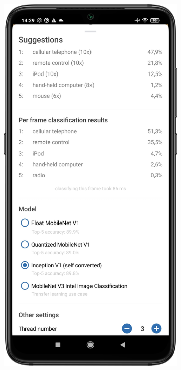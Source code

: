 \documentclass[
			   fontsize=11pt,
               paper=a4,
               bibliography=totoc,
               idxtotoc,
               headsepline,
               footsepline,
               footinclude=false,
               BCOR=12mm,
               DIV=13,
               openany,   %
               ]
               {scrbook}
\begin{document}
\begin{figure}[H]
	\bigskip
	\begin{subfigure}{.23\textwidth}
		\centering
		\includegraphics[width=\linewidth]{figures/app_class_sheet_old.png}

\end{subfigure}
\end{figure}
\end{document}
